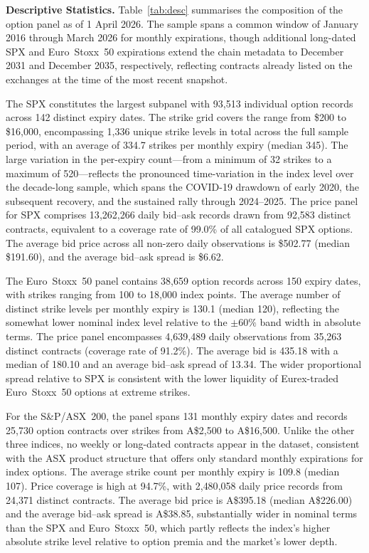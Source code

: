 \documentclass[12pt]{article}
\begin{document}
\bigskip

\noindent\textbf{Descriptive Statistics.}
Table~\ref{tab:desc} summarises the composition of the option panel as of
1 April 2026. The sample spans a common window of January 2016 through March
2026 for monthly expirations, though additional long-dated SPX and Euro~Stoxx~50
expirations extend the chain metadata to December 2031 and December 2035,
respectively, reflecting contracts already listed on the exchanges at the time
of the most recent snapshot.

The SPX constitutes the largest subpanel with 93{,}513 individual option
records across 142 distinct expiry dates. The strike grid covers the range
from \$200 to \$16{,}000, encompassing 1{,}336 unique strike levels in total
across the full sample period, with an average of 334.7 strikes per monthly
expiry (median 345). The large variation in the per-expiry count---from a
minimum of 32 strikes to a maximum of 520---reflects the pronounced
time-variation in the index level over the decade-long sample, which spans the
COVID-19 drawdown of early 2020, the subsequent recovery, and the sustained
rally through 2024--2025. The price panel for SPX comprises 13{,}262{,}266
daily bid--ask records drawn from 92{,}583 distinct contracts, equivalent to
a coverage rate of 99.0\% of all catalogued SPX options. The average bid price
across all non-zero daily observations is \$502.77 (median \$191.60), and the
average bid--ask spread is \$6.62.

The Euro~Stoxx~50 panel contains 38{,}659 option records across 150 expiry
dates, with strikes ranging from 100 to 18{,}000 index points. The average
number of distinct strike levels per monthly expiry is 130.1 (median 120),
reflecting the somewhat lower nominal index level relative to the $\pm60\%$
band width in absolute terms. The price panel encompasses 4{,}639{,}489
daily observations from 35{,}263 distinct contracts (coverage rate of
91.2\%). The average bid is \EUR{}435.18 with a median of \EUR{}180.10 and an
average bid--ask spread of \EUR{}13.34. The wider proportional spread relative
to SPX is consistent with the lower liquidity of Eurex-traded Euro~Stoxx~50
options at extreme strikes.

For the S\&P/ASX~200, the panel spans 131 monthly expiry dates and records
25{,}730 option contracts over strikes from A\$2{,}500 to A\$16{,}500.
Unlike the other three indices, no weekly or long-dated contracts appear in
the dataset, consistent with the ASX product structure that offers only
standard monthly expirations for index options. The average strike count
per monthly expiry is 109.8 (median 107). Price coverage is high at 94.7\%,
with 2{,}480{,}058 daily price records from 24{,}371 distinct contracts.
The average bid price is A\$395.18 (median A\$226.00) and the average
bid--ask spread is A\$38.85, substantially wider in nominal terms than the
SPX and Euro~Stoxx~50, which partly reflects the index's higher absolute
strike level relative to option premia and the market's lower depth.
\end{document}
